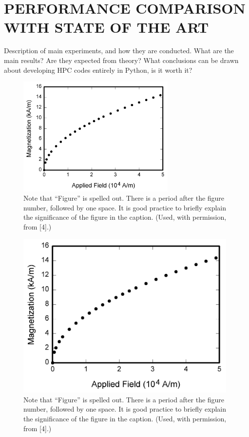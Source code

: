 \documentclass{IEEEcsmag}
\begin{document}
\section{PERFORMANCE COMPARISON WITH STATE OF THE ART}

Description of main experiments, and how they are conducted. What are the main results? Are they expected from theory? What conclusions can be drawn about developing HPC codes entirely in Python, is it worth it?

\begin{figure}
\centerline{\includegraphics[width=18.5pc]{figures/fig1.png}}
\caption{Note that ``Figure'' is spelled out. There is a period after the figure number, followed by one space. It is good practice to briefly explain the significance of the figure in the caption. (Used, with permission, from [4].)}
\end{figure}

\begin{figure}
\centerline{\includegraphics[width=26pc]{figures/fig1.png}}
\caption{Note that ``Figure'' is spelled out. There is a period after the figure number, followed by one space. It is good practice to briefly explain the significance of the figure in the caption. (Used, with permission, from [4].)}
\end{figure}
\end{document}
